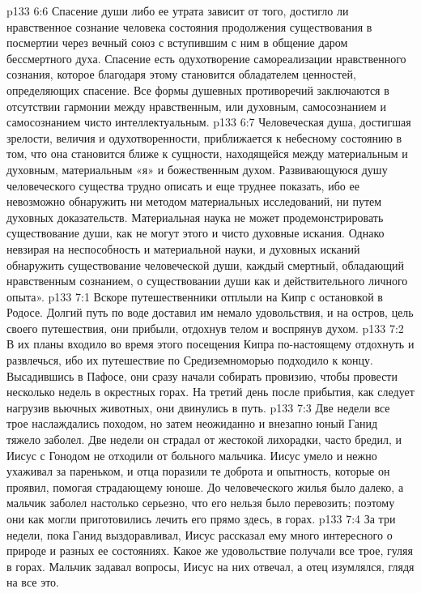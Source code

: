 \vs p133 6:6 Спасение души либо ее утрата зависит от того, достигло ли нравственное сознание человека состояния продолжения существования в посмертии через вечный союз с вступившим с ним в общение даром бессмертного духа. Спасение есть одухотворение самореализации нравственного сознания, которое благодаря этому становится обладателем ценностей, определяющих спасение. Все формы душевных противоречий заключаются в отсутствии гармонии между нравственным, или духовным, самосознанием и самосознанием чисто интеллектуальным.
\vs p133 6:7 Человеческая душа, достигшая зрелости, величия и одухотворенности, приближается к небесному состоянию в том, что она становится ближе к сущности, находящейся между материальным и духовным, материальным «я» и божественным духом. Развивающуюся душу человеческого существа трудно описать и еще труднее показать, ибо ее невозможно обнаружить ни методом материальных исследований, ни путем духовных доказательств. Материальная наука не может продемонстрировать существование души, как не могут этого и чисто духовные искания. Однако невзирая на неспособность и материальной науки, и духовных исканий обнаружить существование человеческой души, каждый смертный, обладающий нравственным сознанием,  о существовании  души как  и действительного личного опыта».
\vs p133 7:1 Вскоре путешественники отплыли на Кипр с остановкой в Родосе. Долгий путь по воде доставил им немало удовольствия, и на остров, цель своего путешествия, они прибыли, отдохнув телом и воспрянув духом.
\vs p133 7:2 В их планы входило во время этого посещения Кипра по\hyp{}настоящему отдохнуть и развлечься, ибо их путешествие по Средиземноморью подходило к концу. Высадившись в Пафосе, они сразу начали собирать провизию, чтобы провести несколько недель в окрестных горах. На третий день после прибытия, как следует нагрузив вьючных животных, они двинулись в путь.
\vs p133 7:3 Две недели все трое наслаждались походом, но затем неожиданно и внезапно юный Ганид тяжело заболел. Две недели он страдал от жестокой лихорадки, часто бредил, и Иисус с Гонодом не отходили от больного мальчика. Иисус умело и нежно ухаживал за пареньком, и отца поразили те доброта и опытность, которые он проявил, помогая страдающему юноше. До человеческого жилья было далеко, а мальчик заболел настолько серьезно, что его нельзя было перевозить; поэтому они как могли приготовились лечить его прямо здесь, в горах.
\vs p133 7:4 За три недели, пока Ганид выздоравливал, Иисус рассказал ему много интересного о природе и разных ее состояниях. Какое же удовольствие получали все трое, гуляя в горах. Мальчик задавал вопросы, Иисус на них отвечал, а отец изумлялся, глядя на все это.
